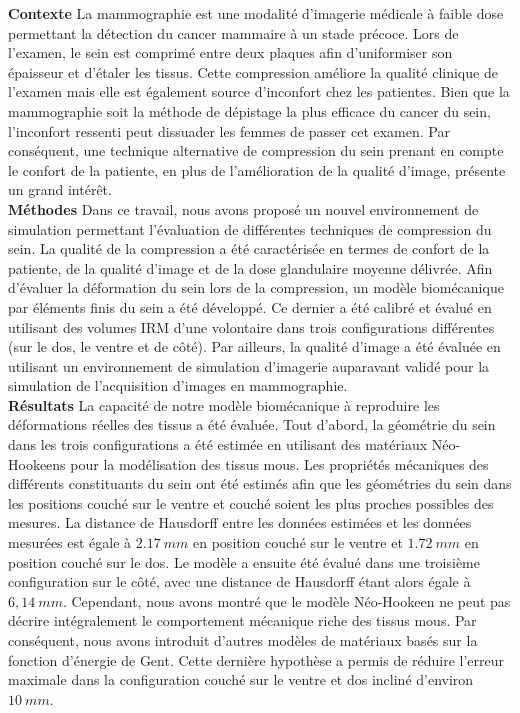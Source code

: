 \noindent
\textbf{Contexte} La mammographie est une modalité d’imagerie médicale à faible dose permettant la détection du cancer mammaire à un stade précoce. Lors de l'examen, le sein est comprimé entre deux plaques afin d'uniformiser son épaisseur et d'étaler les tissus. Cette compression améliore la qualité clinique de l'examen mais elle est également source d'inconfort chez les patientes. Bien que la mammographie soit la méthode de dépistage la plus efficace du cancer du sein, l’inconfort ressenti peut dissuader les femmes de passer cet examen. Par conséquent, une technique alternative de compression du sein prenant en compte le confort de la patiente, en plus de l’amélioration de la qualité d'image, présente un grand intérêt.\\

\noindent
\textbf{Méthodes} Dans ce travail, nous avons proposé un nouvel environnement de simulation permettant l'évaluation de différentes techniques de compression du sein.  La qualité de la compression a été caractérisée en termes de confort de la patiente, de la qualité d'image et de la dose glandulaire moyenne délivrée. Afin d'évaluer la déformation du sein lors de la compression, un modèle biomécanique par éléments finis du sein a été développé. Ce dernier a été calibré et évalué en utilisant des volumes IRM d'une volontaire dans trois configurations différentes (sur le dos, le ventre et de côté). Par ailleurs, la qualité d'image a été évaluée en utilisant un environnement de simulation d'imagerie auparavant validé pour la simulation de l'acquisition d'images en mammographie.\\

\noindent
\textbf{Résultats} La capacité de notre modèle biomécanique à reproduire les déformations réelles des tissus a été évaluée. Tout d'abord, la géométrie du sein dans les trois configurations a été estimée en utilisant des matériaux Néo-Hookeens pour la modélisation des tissus mous. Les propriétés mécaniques des différents constituants du sein ont été estimés afin que les géométries du sein dans les positions couché sur le ventre et couché soient les plus proches possibles des mesures. La distance de Hausdorff entre les données estimées et les données mesurées est égale à $2.17 \ mm$ en position couché sur le ventre et $1.72\ mm$ en position couché sur le dos. Le modèle a ensuite été évalué dans une troisième configuration sur le côté, avec une distance de Hausdorff étant alors égale à $6,14 \ mm $. Cependant, nous avons montré que le modèle Néo-Hookeen ne peut pas décrire intégralement le comportement mécanique riche des tissus mous. Par conséquent, nous avons introduit d'autres modèles de matériaux basés sur la fonction d'énergie de Gent. Cette dernière hypothèse a permis de réduire l'erreur maximale dans la configuration couché sur le ventre et dos incliné d’environ $10\ mm $.\\ 

